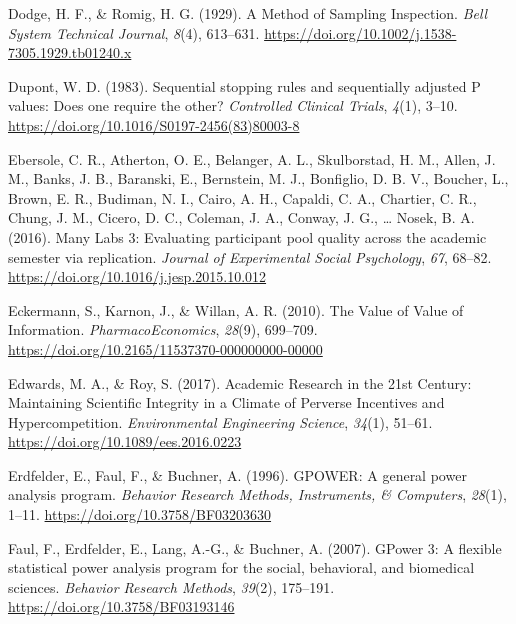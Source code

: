 \documentclass[
  letterpaper,
  DIV=11,
  numbers=noendperiod]{scrreprt}
\newlength{\cslhangindent}
\newlength{\cslentryspacingunit} %
\newenvironment{CSLReferences}[2] %
 {%
  \setlength{\parindent}{0pt}
  \ifodd #1
  \let\oldpar\par
  \def\par{\hangindent=\cslhangindent\oldpar}
  \fi
  \setlength{\parskip}{#2\cslentryspacingunit}
 }%
 {}
\begin{document}
\begin{CSLReferences}{1}{0}
\leavevmode{}%
Dodge, H. F., \& Romig, H. G. (1929). A {Method} of {Sampling
Inspection}. \emph{Bell System Technical Journal}, \emph{8}(4),
613--631. \url{https://doi.org/10.1002/j.1538-7305.1929.tb01240.x}

\leavevmode{}%
Dupont, W. D. (1983). Sequential stopping rules and sequentially
adjusted {P} values: {Does} one require the other? \emph{Controlled
Clinical Trials}, \emph{4}(1), 3--10.
\url{https://doi.org/10.1016/S0197-2456(83)80003-8}

\leavevmode{}%
Ebersole, C. R., Atherton, O. E., Belanger, A. L., Skulborstad, H. M.,
Allen, J. M., Banks, J. B., Baranski, E., Bernstein, M. J., Bonfiglio,
D. B. V., Boucher, L., Brown, E. R., Budiman, N. I., Cairo, A. H.,
Capaldi, C. A., Chartier, C. R., Chung, J. M., Cicero, D. C., Coleman,
J. A., Conway, J. G., \ldots{} Nosek, B. A. (2016). Many {Labs} 3:
{Evaluating} participant pool quality across the academic semester via
replication. \emph{Journal of Experimental Social Psychology},
\emph{67}, 68--82. \url{https://doi.org/10.1016/j.jesp.2015.10.012}

\leavevmode{}%
Eckermann, S., Karnon, J., \& Willan, A. R. (2010). The {Value} of
{Value} of {Information}. \emph{PharmacoEconomics}, \emph{28}(9),
699--709. \url{https://doi.org/10.2165/11537370-000000000-00000}

\leavevmode{}%
Edwards, M. A., \& Roy, S. (2017). Academic {Research} in the 21st
{Century}: {Maintaining Scientific Integrity} in a {Climate} of
{Perverse Incentives} and {Hypercompetition}. \emph{Environmental
Engineering Science}, \emph{34}(1), 51--61.
\url{https://doi.org/10.1089/ees.2016.0223}

\leavevmode{}%
Erdfelder, E., Faul, F., \& Buchner, A. (1996). {GPOWER}: {A} general
power analysis program. \emph{Behavior Research Methods, Instruments, \&
Computers}, \emph{28}(1), 1--11.
\url{https://doi.org/10.3758/BF03203630}

\leavevmode{}%
Faul, F., Erdfelder, E., Lang, A.-G., \& Buchner, A. (2007). {GPower} 3:
{A} flexible statistical power analysis program for the social,
behavioral, and biomedical sciences. \emph{Behavior Research Methods},
\emph{39}(2), 175--191. \url{https://doi.org/10.3758/BF03193146}


\end{CSLReferences}
\end{document}
